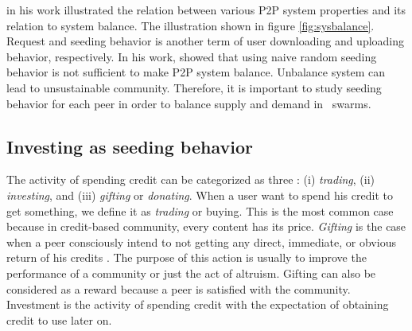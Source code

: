 \citeauthor{2011:managesupplydemand:meulpolder} in his work illustrated the relation between various P2P system properties and its relation to system balance. The illustration shown in figure \ref{fig:sysbalance}. Request and seeding behavior is another term of user downloading and uploading behavior, respectively. In his work, \citeauthor{2011:managesupplydemand:meulpolder} showed that using naive random seeding behavior is not sufficient to make P2P system  balance\cite{2011:managesupplydemand:meulpolder}. Unbalance system can lead to unsustainable community. Therefore, it is important to study seeding behavior for each peer in order to balance supply and demand in \bt~swarms.

\subsection{Investing as seeding behavior}
The activity of spending credit can be categorized as three : (i) \textit{trading}, (ii) \textit{investing}, and (iii) \textit{gifting} or \textit{donating}. When a user want to spend his credit to get something, we define it as \textit{trading} or buying. This is the most common case because in credit-based community, every content has its price. \textit{Gifting} is the case when a peer consciously intend to not getting any direct, immediate, or obvious return of his credits \cite{2006:gifting:ripeanu}. The purpose of this action is usually to improve the performance of a community or just the act of altruism. Gifting can also be considered as a reward because a peer is satisfied with the community. Investment is the activity of spending credit with the expectation of obtaining credit to use later on. 


